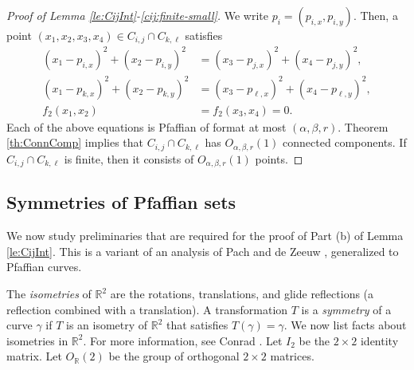 \documentclass[11pt]{article}
\theoremstyle{definition}
\newcommand{\RR}{\mathbb R}
\begin{document}
\begin{proof}[Proof of Lemma \ref{le:CijInt}-\ref{cij:finite-small}]
We write $p_i=(p_{i,x},p_{i,y})$.
Then, a point $(x_1,x_2,x_3,x_4)\in C_{i,j}\cap C_{k,\ell}$ satisfies 
 \begin{align}
  (x_1-p_{i,x})^2 + (x_2-p_{i,y})^2 &= (x_3-p_{j,x})^2 + (x_4-p_{j,y})^2, \nonumber \\[2mm]
   (x_1-p_{k,x})^2 + (x_2-p_{k,y})^2 &= (x_3-p_{\ell,x})^2 + (x_4-p_{\ell,y})^2, \nonumber \\[2mm]
  f_2(x_1,x_2) &= f_2(x_3,x_4)=0. \label{eq:CijTwice}
 \end{align}
Each of the above equations is Pfaffian of format at most $(\alpha,\beta,r)$. 
Theorem \ref{th:ConnComp} implies that $C_{i,j}\cap C_{k,\ell}$ has $O_{\alpha,\beta,r}(1)$ connected components.
If $C_{i,j}\cap C_{k,\ell}$ is finite, then it consists of $O_{\alpha,\beta,r}(1)$ points.
\end{proof}

\subsection{Symmetries of Pfaffian sets}

We now study preliminaries that are required for the proof of Part (b) of Lemma \ref{le:CijInt}.
This is a variant of an analysis of Pach and de Zeeuw \cite{PachDZ17}, generalized to Pfaffian curves.

The \emph{isometries} of $\RR^2$ are the rotations, translations, and glide reflections (a reflection
combined with a translation).
A transformation $T$ is a \emph{symmetry} of a curve $\gamma$ if $T$ is an isometry of $\RR^2$ that satisfies $T(\gamma) = \gamma$.
We now list facts about isometries in $\RR^2$. 
For more information, see Conrad \cite{Conrad}.
Let $I_2$ be the $2\times 2$ identity matrix.
Let $O_\RR(2)$ be the group of orthogonal $2\times 2$ matrices. 
\end{document}
